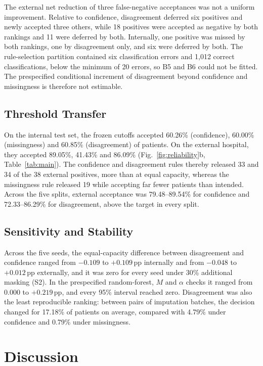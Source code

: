 \documentclass[conference]{IEEEtran}
\newcommand{\pp}{\,pp}
\begin{document}
The external net reduction of three false-negative acceptances was not a uniform improvement. Relative to confidence, disagreement deferred six positives and newly accepted three others, while 18 positives were accepted as negative by both rankings and 11 were deferred by both. Internally, one positive was missed by both rankings, one by disagreement only, and six were deferred by both. The rule-selection partition contained six classification errors and 1,012 correct classifications, below the minimum of 20 errors, so B5 and B6 could not be fitted. The prespecified conditional increment of disagreement beyond confidence and missingness is therefore not estimable.

\subsection{Threshold Transfer}
On the internal test set, the frozen cutoffs accepted 60.26\% (confidence), 60.00\% (missingness) and 60.85\% (disagreement) of patients. On the external hospital, they accepted 89.05\%, 41.43\% and 86.09\% (Fig.~\ref{fig:reliability}b, Table~\ref{tab:main}). The confidence and disagreement rules thereby released 33 and 34 of the 38 external positives, more than at equal capacity, whereas the missingness rule released 19 while accepting far fewer patients than intended. Across the five splits, external acceptance was 79.48--89.54\% for confidence and 72.33--86.29\% for disagreement, above the target in every split.

\subsection{Sensitivity and Stability}
Across the five seeds, the equal-capacity difference between disagreement and confidence ranged from $-0.109$ to $+0.109$\pp{} internally and from $-0.048$ to $+0.012$\pp{} externally, and it was zero for every seed under 30\% additional masking (S2). In the prespecified random-forest, $M$ and $\alpha$ checks it ranged from $0.000$ to $+0.219$\pp{}, and every 95\% interval reached zero. Disagreement was also the least reproducible ranking: between pairs of imputation batches, the decision changed for 17.18\% of patients on average, compared with 4.79\% under confidence and 0.79\% under missingness.

\section{Discussion}
\end{document}
